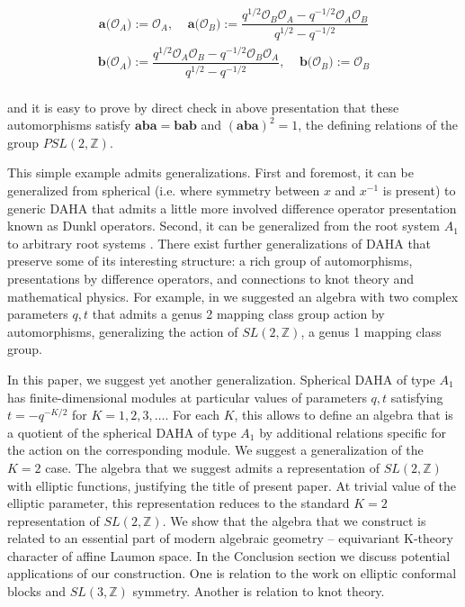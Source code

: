 \documentclass{amsart}
\newcommand{\Oa}{\mathcal O_A}
\newcommand{\Ob}{\mathcal O_B}
\begin{document}
\begin{align}
\mathbf a\big(\Oa\big) := \Oa, \ \ \ \ \ \mathbf a \big(\Ob\big) := \dfrac{q^{1/2} \Ob \Oa - q^{-1/2} \Oa \Ob}{q^{1/2} - q^{-1/2}}
\end{align}
\begin{align}
\mathbf b\big(\Oa\big) := \dfrac{q^{1/2} \Oa \Ob - q^{-1/2} \Ob \Oa}{q^{1/2} - q^{-1/2}}, \ \ \ \ \ \mathbf b\big(\Ob\big) := \Ob 
\end{align}
\smallskip\\
and it is easy to prove by direct check in above presentation that these automorphisms satisfy $\mathbf a\mathbf b\mathbf a = \mathbf b\mathbf a\mathbf b$ and $(\mathbf{aba})^2 = 1$, the defining relations of the group $PSL(2,{\mathbb Z})$.

This simple example admits generalizations. First and foremost, it can be generalized from spherical (i.e. where symmetry between $x$ and $x^{-1}$ is present) to generic DAHA that admits a little more involved difference operator presentation known as Dunkl operators. Second, it can be generalized from the root system $A_1$ to arbitrary root systems \cite{Cherednik'1995,Cherednik'1995-Inventiones,Cherednik'1995-IMRN,Sahi'1999}. There exist further generalizations of DAHA that preserve some of its interesting structure: a rich group of automorphisms, presentations by difference operators, and connections to knot theory and mathematical physics. For example, in \cite{ArthamonovShakirov'2019} we suggested an algebra with two complex parameters $q,t$ that admits a genus 2 mapping class group action by automorphisms, generalizing the action of $SL(2,{\mathbb Z})$, a genus 1 mapping class group. 

In this paper, we suggest yet another generalization. Spherical DAHA of type $A_1$ has finite-dimensional modules at particular values of parameters $q,t$ satisfying $t = - q^{-K/2}$ for $K = 1,2,3,\ldots$. For each $K$, this allows to define an algebra that is a quotient of the spherical DAHA of type $A_1$ by additional relations specific for the action on the corresponding module. We suggest a generalization of the $K=2$ case. The algebra that we suggest admits a representation of $SL(2,{\mathbb Z})$ with elliptic functions, justifying the title of present paper. At trivial value of the elliptic parameter, this representation reduces to the standard $K=2$ representation of $SL(2,{\mathbb Z})$. We show that the algebra that we construct is related to an essential part of modern algebraic geometry -- equivariant K-theory character of affine Laumon space. In the Conclusion section we  discuss potential applications of our construction. One is relation to the work \cite{FelderVarchenko'2001} on elliptic conformal blocks and $SL(3,{\mathbb Z})$ symmetry. Another is relation to knot theory. 
\end{document}
